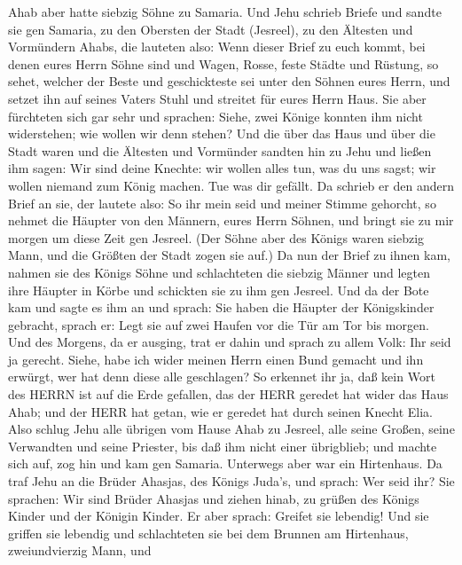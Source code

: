  Ahab aber hatte siebzig Söhne zu Samaria. Und Jehu schrieb
Briefe und sandte sie gen Samaria, zu den Obersten der Stadt (Jesreel),
zu den Ältesten und Vormündern Ahabs, die lauteten also: 
Wenn dieser Brief zu euch kommt, bei denen eures Herrn Söhne sind und
Wagen, Rosse, feste Städte und Rüstung,  so sehet, welcher
der Beste und geschickteste sei unter den Söhnen eures Herrn, und setzet
ihn auf seines Vaters Stuhl und streitet für eures Herrn Haus.
 Sie aber fürchteten sich gar sehr und sprachen: Siehe, zwei
Könige konnten ihm nicht widerstehen; wie wollen wir denn stehen?
 Und die über das Haus und über die Stadt waren und die
Ältesten und Vormünder sandten hin zu Jehu und ließen ihm sagen: Wir
sind deine Knechte: wir wollen alles tun, was du uns sagst; wir wollen
niemand zum König machen. Tue was dir gefällt.  Da schrieb
er den andern Brief an sie, der lautete also: So ihr mein seid und
meiner Stimme gehorcht, so nehmet die Häupter von den Männern, eures
Herrn Söhnen, und bringt sie zu mir morgen um diese Zeit gen Jesreel.
(Der Söhne aber des Königs waren siebzig Mann, und die Größten der Stadt
zogen sie auf.)  Da nun der Brief zu ihnen kam, nahmen sie
des Königs Söhne und schlachteten die siebzig Männer und legten ihre
Häupter in Körbe und schickten sie zu ihm gen Jesreel.  Und
da der Bote kam und sagte es ihm an und sprach: Sie haben die Häupter
der Königskinder gebracht, sprach er: Legt sie auf zwei Haufen vor die
Tür am Tor bis morgen.  Und des Morgens, da er ausging, trat
er dahin und sprach zu allem Volk: Ihr seid ja gerecht. Siehe, habe ich
wider meinen Herrn einen Bund gemacht und ihn erwürgt, wer hat denn
diese alle geschlagen?  So erkennet ihr ja, daß kein Wort
des HERRN ist auf die Erde gefallen, das der HERR geredet hat wider das
Haus Ahab; und der HERR hat getan, wie er geredet hat durch seinen
Knecht Elia.  Also schlug Jehu alle übrigen vom Hause Ahab
zu Jesreel, alle seine Großen, seine Verwandten und seine Priester, bis
daß ihm nicht einer übrigblieb;  und machte sich auf, zog
hin und kam gen Samaria. Unterwegs aber war ein Hirtenhaus.
 Da traf Jehu an die Brüder Ahasjas, des Königs Juda's, und
sprach: Wer seid ihr? Sie sprachen: Wir sind Brüder Ahasjas und ziehen
hinab, zu grüßen des Königs Kinder und der Königin Kinder. 
Er aber sprach: Greifet sie lebendig! Und sie griffen sie lebendig und
schlachteten sie bei dem Brunnen am Hirtenhaus, zweiundvierzig Mann, und
